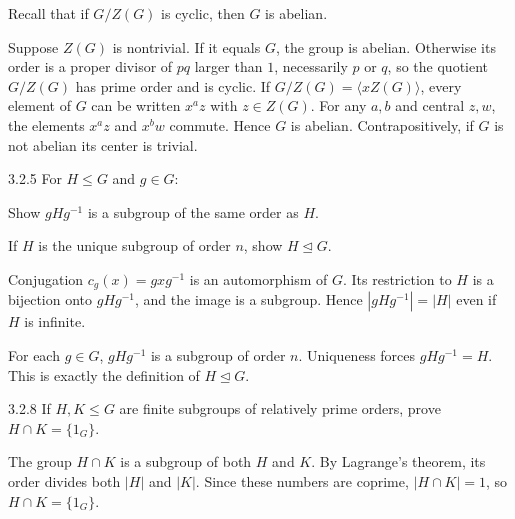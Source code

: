 \documentclass[11pt,oneside]{article}
\begin{document}
\begin{hint}
Recall that if $G/Z(G)$ is cyclic, then $G$ is abelian.
\end{hint}

\begin{solution}
Suppose $Z(G)$ is nontrivial. If it equals $G$, the group is abelian. Otherwise its order is a proper divisor of $pq$ larger than $1$, necessarily $p$ or $q$, so the quotient $G/Z(G)$ has prime order and is cyclic. If $G/Z(G)=\langle xZ(G)\rangle$, every element of $G$ can be written $x^az$ with $z\in Z(G)$. For any $a,b$ and central $z,w$, the elements $x^az$ and $x^bw$ commute. Hence $G$ is abelian. Contrapositively, if $G$ is not abelian its center is trivial.
\end{solution}

\begin{exercise}{3.2.5}
For $H\le G$ and $g\in G$:
\begin{exercisesubparts}
\item Show $gHg^{-1}$ is a subgroup of the same order as $H$.
\item If $H$ is the unique subgroup of order $n$, show $H\trianglelefteq G$.
\end{exercisesubparts}
\end{exercise}

\begin{solution}
\begin{exercisesubparts}
\item Conjugation $c_g(x)=gxg^{-1}$ is an automorphism of $G$. Its restriction to $H$ is a bijection onto $gHg^{-1}$, and the image is a subgroup. Hence $|gHg^{-1}|=|H|$ even if $H$ is infinite.
\item For each $g\in G$, $gHg^{-1}$ is a subgroup of order $n$. Uniqueness forces $gHg^{-1}=H$. This is exactly the definition of $H\trianglelefteq G$.
\end{exercisesubparts}
\end{solution}

\begin{exercise}{3.2.8}
If $H,K\le G$ are finite subgroups of relatively prime orders, prove $H\cap K=\{1_G\}$.
\end{exercise}

\begin{solution}
The group $H\cap K$ is a subgroup of both $H$ and $K$. By Lagrange's theorem, its order divides both $|H|$ and $|K|$. Since these numbers are coprime, $|H\cap K|=1$, so $H\cap K=\{1_G\}$.
\end{solution}
\end{document}
